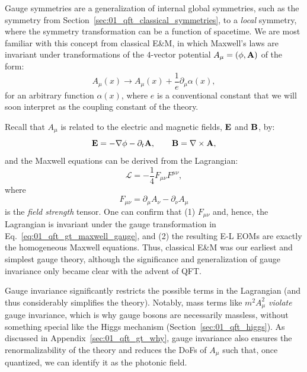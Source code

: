 Gauge symmetries are a generalization of internal global symmetries, such as the \UU[1] symmetry from Section~\ref{sec:01_qft_classical_symmetries}, to a \textit{local} symmetry, where the symmetry transformation can be a function of spacetime.
We are most familiar with this concept from classical E\&M, in which Maxwell's laws are invariant under transformations of the $4$-vector potential $A_\mu = (\phi, \mathbf{A})$ of the form:
\begin{equation}
	\label{eq:01_qft_gt_maxwell_gauge}
	A_\mu(x) \rightarrow A_\mu(x) + \frac{1}{e}\partial_\mu\alpha(x),
\end{equation}
for an arbitrary function $\alpha(x)$, where $e$ is a conventional constant that we will soon interpret as the coupling constant of the theory.

Recall that $A_\mu$ is related to the electric and magnetic fields, $\mathbf{E}$ and $\mathbf{B}$, by:
\begin{equation}
	\label{eq:01_qft_gt_maxwell_fields}
	\mathbf{E} = -\nabla\phi - \partial_t\mathbf{A}, \qquad \mathbf{B} = \nabla\times\mathbf{A},
\end{equation}
and the Maxwell equations can be derived from the Lagrangian:
\begin{equation}
	\label{eq:01_qft_gt_maxwell_lagrangian}
	\mathcal L = -\frac{1}{4}F_{\mu\nu}F^{\mu\nu},
\end{equation}
where
\begin{equation}
	\label{eq:01_qft_gt_maxwell_field_strength}
	F_{\mu\nu} = \partial_\mu A_\nu - \partial_\nu A_\mu
\end{equation}
is the \textit{field strength} tensor.
One can confirm that (1) $F_{\mu\nu}$ and, hence, the Lagrangian is invariant under the gauge transformation in Eq.~\ref{eq:01_qft_gt_maxwell_gauge}, and (2) the resulting E-L EOMs are exactly the homogeneous Maxwell equations.
Thus, classical E\&M was our earliest and simplest gauge theory, although the significance and generalization of gauge invariance only became clear with the advent of QFT.

Gauge invariance significantly restricts the possible terms in the Lagrangian (and thus considerably simplifies the theory).
Notably, mass terms like $m^2A_\mu^2$ \textit{violate} gauge invariance, which is why gauge bosons are necessarily massless, without something special like the Higgs mechanism (Section~\ref{sec:01_qft_higgs}).
As discussed in Appendix~\ref{sec:01_qft_gt_why}, gauge invariance also ensures the renormalizability of the theory and reduces the DoFs of $A_\mu$ such that, once quantized, we can identify it as the photonic field.

